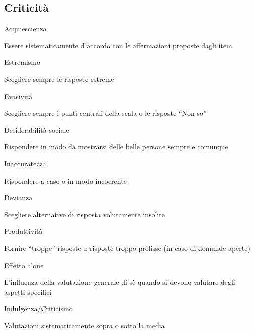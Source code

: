 \documentclass[compress]{beamer}
\begin{document}
\subsection*{Criticità}
\begin{frame}
	\begin{block}{Acquiescienza}
		
		Essere sistematicamente d'accordo con le affermazioni proposte dagli item
	\end{block}
	
	\begin{block}{Estremismo}
		
		Scegliere sempre le risposte estreme
	\end{block}
	
	\begin{block}{Evasività}
		
		Scegliere sempre i punti centrali della scala o le risposte ``Non so''
	\end{block}
	
	\begin{block}{Desiderabilità sociale}
		
		Rispondere in modo da mostrarsi delle belle persone sempre e comunque	
	\end{block}
	
\end{frame}



\begin{frame}
	\begin{block}{Inaccuratezza}
		
		Rispondere a caso o in modo incoerente
	\end{block}
	
	
	\begin{block}{Devianza}
		
		Scegliere alternative di risposta volutamente insolite
	\end{block}
	
	\begin{block}{Produttività}
		
		Fornire ``troppe'' risposte o risposte troppo prolisse (in caso di domande aperte)
	\end{block}
	
	\begin{block}{Effetto alone}
		
		L'influenza della valutazione generale di sè quando si devono valutare degli aspetti specifici
	\end{block}
	
	\begin{block}{Indulgenza/Criticismo}
		
		Valutazioni sistematicamente sopra o sotto la media
	\end{block}
\end{frame}
\end{document}
